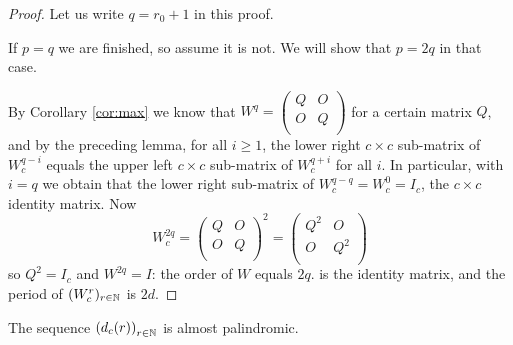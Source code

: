 \begin{proof}
  Let us write $q=r_0+1$ in this proof.

  If $p=q$ we are finished, so assume it is not. We will show that $p=2q$ in
  that case.

  By Corollary \ref{cor:max} we know that 
  $W^{q}=\left(\begin{smallmatrix} Q & O \\ O & Q \\\end{smallmatrix}\right)$
  for a certain matrix $Q$, and by the preceding lemma, for all $i\geq 1$,
  the lower right $c\times c$ sub-matrix of
  $W_{c}^{q-i}$ equals the upper left $c\times c$ sub-matrix of $W_{c}^{q+i}$
  for all $i$. In particular, with $i=q$ we obtain that
  the lower right sub-matrix of
  $W_{c}^{q-q} = W_{c}^{0} = I_c$, the $c\times c$ identity matrix.
  Now
  \[
  W_{c}^{2q}
  =
  \left(
  \begin{array}{cc}
    Q & O \\
    O & Q \\
  \end{array}
  \right)^{2}
  =
  \left(
  \begin{array}{cc}
    Q^{2} & O \\
    O & Q^{2} \\
  \end{array}
  \right)
  \]
  so $Q^{2}=I_c$ and $W^{2q}=I$: the order of $W$ equals $2q$.
  is the identity matrix, and the period of $(W_{c}^{r})_{r\in\mathbb{N}}$ is $2d$.
\end{proof}

\begin{theorem}[Observation 5]
  The sequence $\left(d_{c}(r)\right)_{r\in\mathbb{N}}$
  is almost palindromic.
\end{theorem}

